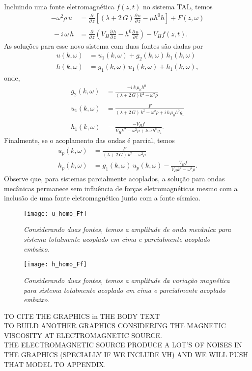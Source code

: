 Incluindo uma fonte eletromagn\'etica $f(z,t)$ no sistema TAL, temos
\begin{align}
-\omega^2\rho\,u&=\frac{\partial}{\partial\,z}\left[(\lambda+2\,G)\frac{\partial\,u}{\partial\,z}-\mu h^0h\right]+F(z,\omega)\\\nonumber\\\
-i\,\omega\,h&=\frac{\partial}{\partial\,z}\left(V_H\frac{\partial\,h}{\partial\,z}-h^0\frac{\partial\,u}{\partial\,t}\right)-V_H f(z,t).
\end{align}
As solu\c{c}\~oes para esse novo sistema com duas fontes s\~ao dadas por 
\begin{align*}
u(k,\omega)&=u_1(k,\omega)+g_2(k,\omega)\,h_1(k,\omega)\\
h(k,\omega)&=g_1(k,\omega)\,u_1(k,\omega)+h_1(k,\omega),
\end{align*}
onde,
\begin{align*}
g_2(k,\omega)&=\frac{-i\,k\,\mu_0h^0}{(\lambda+2\,G)k^2-\omega^2\rho}\\\\
u_1(k,\omega)&=\frac{F}{(\lambda+2\,G)\,k^2-\omega^2\rho+i\,k\,\mu_0h^0g_1}\\\\
h_1(k,\omega)&=\frac{-V_Hf}{V_Hk^2-\omega^2\rho+k\,\omega\,h^0g_2}.
\end{align*}
Finalmente, se o acoplamento das ondas \'e parcial, temos
\begin{align*}
u_p(k,\omega)&=\frac{F}{(\lambda+2\,G)\,k^2-\omega^2\rho}\\
h_p(k,\omega)&=g_1(k,\omega)\,u_p(k,\omega)-\frac{V_Hf}{V_Hk^2-\omega^2\rho} .
\end{align*}
Observe que, para sistemas parcialmente acoplados, a solu\c{c}\~ao para ondas mec\^anicas permanece sem influ\^encia de for\c{c}as eletromagn\'eticas mesmo com a inclus\~ao de uma fonte eletromagn\'etica junto com a fonte s\'ismica. 

\begin{figure}
\centering
\texttt{[image: u\_homo\_Ff]}
\caption{\textit{Considerando duas fontes, temos a amplitude de onda mec\^anica para sistema totalmente acoplado em cima e parcialmente acoplado embaixo.}}
\end{figure}

\begin{figure}
\centering
\texttt{[image: h\_homo\_Ff]}
\caption{\textit{Considerando duas fontes, temos a amplitude da varia\c{c}\~ao magn\'etica para sistema totalmente acoplado em cima e parcialmente acoplado embaixo.}}
\end{figure}

TO CITE THE GRAPHICS in THE BODY TEXT\\
TO BUILD ANOTHER GRAPHICS CONSIDERING THE MAGNETIC VISCOSITY AT ELECTROMAGNETIC SOURCE.\\
THE ELECTROMAGNETIC SOURCE PRODUCE A LOT'S OF NOISES IN THE GRAPHICS (SPECIALLY IF WE INCLUDE VH) AND WE WILL PUSH THAT MODEL TO APPENDIX.



